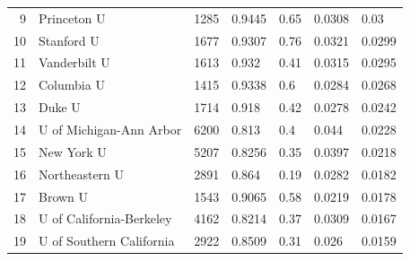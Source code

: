 \documentclass[12pt]{article}
\theoremstyle{definition}
\begin{document}
\begin{table}[]
\begin{tabular}{r|l|r|l|l|l|l}
9                                  & Princeton U                           & 1285                                 & 0.9445                  & 0.65           & 0.0308              & 0.03                                \\
10                                 & Stanford U                            & 1677                                 & 0.9307                  & 0.76           & 0.0321              & 0.0299                              \\
11                                 & Vanderbilt U                          & 1613                                 & 0.932                   & 0.41           & 0.0315              & 0.0295                              \\
12                                 & Columbia U    & 1415                                 & 0.9338                  & 0.6            & 0.0284              & 0.0268                              \\
13                                 & Duke U                                & 1714                                 & 0.918                   & 0.42           & 0.0278              & 0.0242                              \\
14                                 & U of Michigan-Ann Arbor               & 6200                                 & 0.813                   & 0.4            & 0.044               & 0.0228                              \\
15                                 & New York U                            & 5207                                 & 0.8256                  & 0.35           & 0.0397              & 0.0218                              \\
16                                 & Northeastern U                        & 2891                                 & 0.864                   & 0.19           & 0.0282              & 0.0182                              \\
17                                 & Brown U                               & 1543                                 & 0.9065                  & 0.58           & 0.0219              & 0.0178                              \\
18                                 & U of California-Berkeley              & 4162                                 & 0.8214                  & 0.37           & 0.0309              & 0.0167                              \\
19                                 & U of Southern California              & 2922                                 & 0.8509                  & 0.31           & 0.026               & 0.0159                              \\

\end{tabular}
\end{table}
\end{document}
